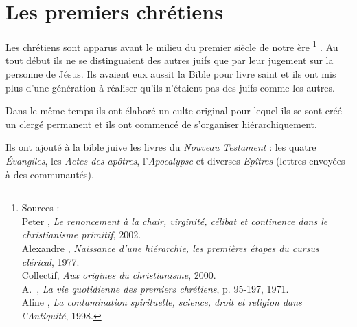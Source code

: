 


\chapter{Les premiers chrétiens}


 Les chrétiens sont apparus avant le milieu du premier siècle de notre ère%
\footnote{Sources :\\
Peter , \emph{Le renoncement à la chair, virginité, célibat et continence dans le christianisme primitif}, 2002.\\
Alexandre , \emph{Naissance d'une hiérarchie, les premières étapes du cursus clérical}, 1977.\\
Collectif, \emph{Aux origines du christianisme}, 2000.\\
A.~, \emph{La vie quotidienne des premiers chrétiens}, p. 95-197, 1971.\\
Aline , \emph{La contamination spirituelle, science, droit et religion dans l'Antiquité}, 1998.}%
. Au tout début ils ne se distinguaient des autres juifs que par leur jugement sur la personne de Jésus. Ils avaient eux aussit la Bible pour livre saint et ils ont mis plus d'une génération à réaliser qu'ils n'étaient pas des juifs comme les autres. 



Dans le même temps ils ont élaboré un culte original pour lequel ils se sont créé un clergé permanent et ils ont commencé de s'organiser hiérarchiquement. 

Ils ont ajouté à la bible juive les livres du \emph{Nouveau Testament} : les quatre \emph{Évangiles}, les \emph{Actes des apôtres}, l'\emph{Apocalypse} et diverses \emph{Epîtres} (lettres envoyées à des communautés). 


